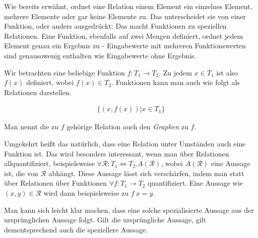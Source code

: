 Wie bereits erwähnt, ordnet eine Relation einem Element ein einzelnes Element, mehrere Elemente oder gar keine Elemente zu.
Das unterscheidet sie von einer Funktion, oder anders ausgedrückt: Das macht Funktionen zu speziellen Relationen. Eine
Funktion, ebenfalls auf zwei Mengen definiert, ordnet jedem Element genau ein Ergebnis zu - Eingabewerte mit
mehreren Funktionswerten sind genausowenig enthalten wie Eingabewerte ohne Ergebnis.

Wir betrachten eine beliebige Funktion $f : T_1 \rightarrow T_2$. Zu jedem $x \in T_1$ ist also $f(x)$ definiert, wobei $f(x) \in T_2$. Funktionen kann man auch wie folgt als Relationen darstellen.

\begin{align*}
\{ (x, f(x)) | x \in T_1 \}
\end{align*}

Man nennt die zu $f$ gehörige Relation auch den \textit{Graphen} zu $f$.

Umgekehrt heißt das natürlich, dass eine Relation unter Umständen auch eine Funktion ist. Das wird besonders interessant, wenn man
über Relationen allquantifiziert, beispielsweise $\forall \mathcal{R} : T_1 \Leftrightarrow T_2 . A(\mathcal{R})$, wobei $A(\mathcal{R})$
eine Aussage ist, die von $\mathcal{R}$ abhängt.
Diese Aussage lässt sich verschärfen, indem man statt über Relationen über Funktionen $\forall f : T_1 \rightarrow T_2$ quantifiziert.
Eine Aussage wie  $(x, y) \in \mathcal{R}$ wird dann beispielsweise zu $f\ x = y$.

Man kann sich leicht klar machen, dass eine solche spezialisierte Aussage aus der ursprünglichen Aussage folgt. Gilt die ursprüngliche
Aussage, gilt dementsprechend auch die speziellere Aussage.

%
%


